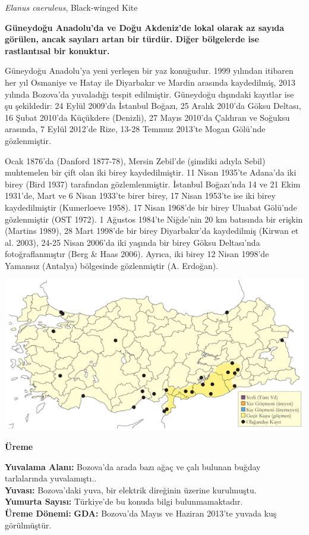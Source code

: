 \documentclass[
  letterpaper,
  DIV=11,
  numbers=noendperiod]{scrreprt}
\begin{document}
\emph{Elanus caeruleus}, Black-winged Kite

\textbf{Güneydoğu Anadolu'da ve Doğu Akdeniz'de lokal olarak az sayıda
görülen, ancak sayıları artan bir türdür. Diğer bölgelerde ise
rastlantısal bir konuktur.}

Güneydoğu Anadolu'ya yeni yerleşen bir yaz konuğudur. 1999 yılından
itibaren her yıl Osmaniye ve Hatay ile Diyarbakır ve Mardin arasında
kaydedilmiş, 2013 yılında Bozova'da yuvaladığı tespit edilmiştir.
Güneydoğu dışındaki kayıtlar ise şu şekildedir: 24 Eylül 2009'da
İstanbul Boğazı, 25 Aralık 2010'da Göksu Deltası, 16 Şubat 2010'da
Küçükdere (Denizli), 27 Mayıs 2010'da Çaldıran ve Soğuksu arasında, 7
Eylül 2012'de Rize, 13-28 Temmuz 2013'te Mogan Gölü'nde gözlenmiştir.

Ocak 1876'da (Danford 1877-78), Mersin Zebil'de (şimdiki adıyla Sebil)
muhtemelen bir çift olan iki birey kaydedilmiştir. 11 Nisan 1935'te
Adana'da iki birey (Bird 1937) tarafından gözlemlenmiştir. İstanbul
Boğazı'nda 14 ve 21 Ekim 1931'de, Mart ve 6 Nisan 1933'te birer birey,
17 Nisan 1953'te ise iki birey kaydedilmiştir (Kumerloeve 1958). 17
Nisan 1968'de bir birey Uluabat Gölü'nde gözlenmiştir (OST 1972). 1
Ağustos 1984'te Niğde'nin 20 km batısında bir erişkin (Martins 1989), 28
Mart 1998'de bir birey Diyarbakır'da kaydedilmiş (Kirwan et al. 2003),
24-25 Nisan 2006'da iki yaşında bir birey Göksu Deltası'nda
fotoğraflanmıştır (Berg \& Haas 2006). Ayrıca, iki birey 12 Nisan
1998'de Yamansız (Antalya) bölgesinde gözlenmiştir (A. Erdoğan).

\includegraphics{images/harita_Page_082.png}

\textbf{Üreme}

\textbf{Yuvalama Alanı:} Bozova'da arada bazı ağaç ve çalı bulunan
buğday tarlalarında yuvalamıştı..\\
\textbf{Yuvası:} Bozova'daki yuva, bir elektrik direğinin üzerine
kurulmuştu.\\
\textbf{Yumurta Sayısı:} Türkiye'de bu konuda bilgi bulunmamaktadır.\\
\textbf{Üreme Dönemi:} \textbf{GDA:} Bozova'da Mayıs ve Haziran 2013'te
yuvada kuş görülmüştür.
\end{document}
